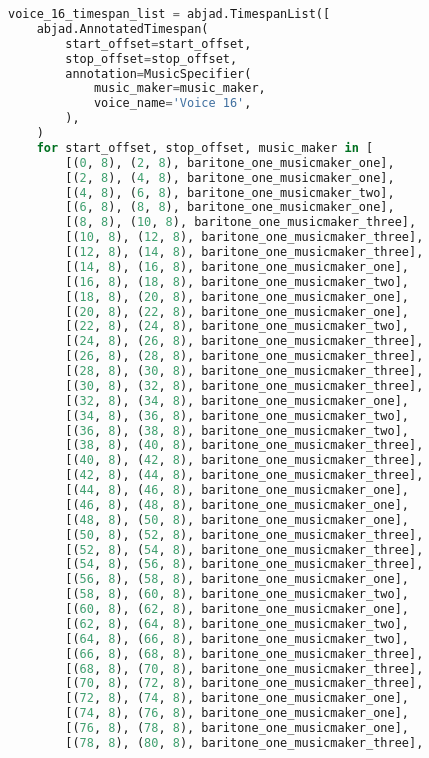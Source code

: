 \begin{lstlisting}[language=Python, caption=Invocation Source Code]
voice_16_timespan_list = abjad.TimespanList([
    abjad.AnnotatedTimespan(
        start_offset=start_offset,
        stop_offset=stop_offset,
        annotation=MusicSpecifier(
            music_maker=music_maker,
            voice_name='Voice 16',
        ),
    )
    for start_offset, stop_offset, music_maker in [
        [(0, 8), (2, 8), baritone_one_musicmaker_one],
        [(2, 8), (4, 8), baritone_one_musicmaker_one],
        [(4, 8), (6, 8), baritone_one_musicmaker_two],
        [(6, 8), (8, 8), baritone_one_musicmaker_one],
        [(8, 8), (10, 8), baritone_one_musicmaker_three],
        [(10, 8), (12, 8), baritone_one_musicmaker_three],
        [(12, 8), (14, 8), baritone_one_musicmaker_three],
        [(14, 8), (16, 8), baritone_one_musicmaker_one],
        [(16, 8), (18, 8), baritone_one_musicmaker_two],
        [(18, 8), (20, 8), baritone_one_musicmaker_one],
        [(20, 8), (22, 8), baritone_one_musicmaker_one],
        [(22, 8), (24, 8), baritone_one_musicmaker_two],
        [(24, 8), (26, 8), baritone_one_musicmaker_three],
        [(26, 8), (28, 8), baritone_one_musicmaker_three],
        [(28, 8), (30, 8), baritone_one_musicmaker_three],
        [(30, 8), (32, 8), baritone_one_musicmaker_three],
        [(32, 8), (34, 8), baritone_one_musicmaker_one],
        [(34, 8), (36, 8), baritone_one_musicmaker_two],
        [(36, 8), (38, 8), baritone_one_musicmaker_two],
        [(38, 8), (40, 8), baritone_one_musicmaker_three],
        [(40, 8), (42, 8), baritone_one_musicmaker_three],
        [(42, 8), (44, 8), baritone_one_musicmaker_three],
        [(44, 8), (46, 8), baritone_one_musicmaker_one],
        [(46, 8), (48, 8), baritone_one_musicmaker_one],
        [(48, 8), (50, 8), baritone_one_musicmaker_one],
        [(50, 8), (52, 8), baritone_one_musicmaker_three],
        [(52, 8), (54, 8), baritone_one_musicmaker_three],
        [(54, 8), (56, 8), baritone_one_musicmaker_three],
        [(56, 8), (58, 8), baritone_one_musicmaker_one],
        [(58, 8), (60, 8), baritone_one_musicmaker_two],
        [(60, 8), (62, 8), baritone_one_musicmaker_one],
        [(62, 8), (64, 8), baritone_one_musicmaker_two],
        [(64, 8), (66, 8), baritone_one_musicmaker_two],
        [(66, 8), (68, 8), baritone_one_musicmaker_three],
        [(68, 8), (70, 8), baritone_one_musicmaker_three],
        [(70, 8), (72, 8), baritone_one_musicmaker_three],
        [(72, 8), (74, 8), baritone_one_musicmaker_one],
        [(74, 8), (76, 8), baritone_one_musicmaker_one],
        [(76, 8), (78, 8), baritone_one_musicmaker_one],
        [(78, 8), (80, 8), baritone_one_musicmaker_three],

\end{lstlisting}
